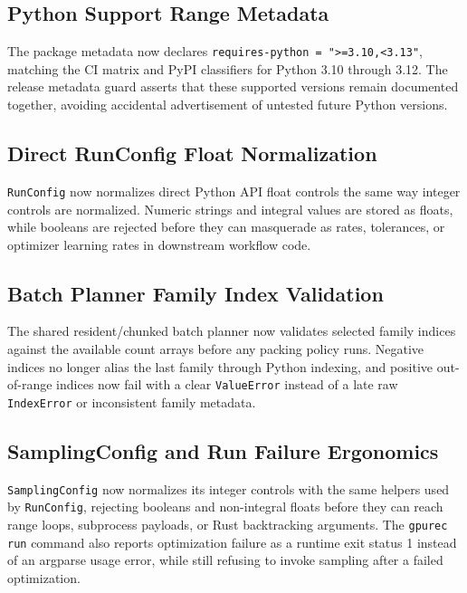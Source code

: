 \documentclass[11pt]{article}
\begin{document}
\subsection{Python Support Range Metadata}

The package metadata now declares \texttt{requires-python = ">=3.10,<3.13"},
matching the CI matrix and PyPI classifiers for Python 3.10 through 3.12.
The release metadata guard asserts that these supported versions remain
documented together, avoiding accidental advertisement of untested future
Python versions.

\subsection{Direct RunConfig Float Normalization}

\texttt{RunConfig} now normalizes direct Python API float controls the same way
integer controls are normalized.  Numeric strings and integral values are
stored as floats, while booleans are rejected before they can masquerade as
rates, tolerances, or optimizer learning rates in downstream workflow code.

\subsection{Batch Planner Family Index Validation}

The shared resident/chunked batch planner now validates selected family indices
against the available count arrays before any packing policy runs.  Negative
indices no longer alias the last family through Python indexing, and positive
out-of-range indices now fail with a clear \texttt{ValueError} instead of a
late raw \texttt{IndexError} or inconsistent family metadata.

\subsection{SamplingConfig and Run Failure Ergonomics}

\texttt{SamplingConfig} now normalizes its integer controls with the same
helpers used by \texttt{RunConfig}, rejecting booleans and non-integral floats
before they can reach range loops, subprocess payloads, or Rust backtracking
arguments.  The \texttt{gpurec run} command also reports optimization failure as
a runtime exit status 1 instead of an argparse usage error, while still
refusing to invoke sampling after a failed optimization.
\end{document}
